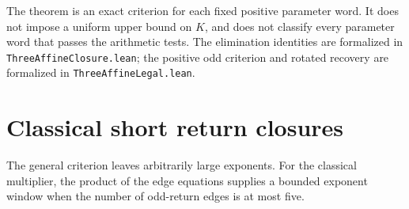 \documentclass[11pt,letterpaper]{article}
\begin{document}
The theorem is an exact criterion for each fixed positive parameter
word. It does not impose a uniform upper bound on \(K\), and does not
classify every parameter word that passes the arithmetic tests.
The elimination identities are formalized in \texttt{ThreeAffineClosure.lean};
the positive odd criterion and rotated recovery are formalized in
\texttt{ThreeAffineLegal.lean}.

\section{Classical short return closures}

The general criterion leaves arbitrarily large exponents. For the classical
multiplier, the product of the edge equations supplies a bounded exponent
window when the number of odd-return edges is at most five.
\end{document}
